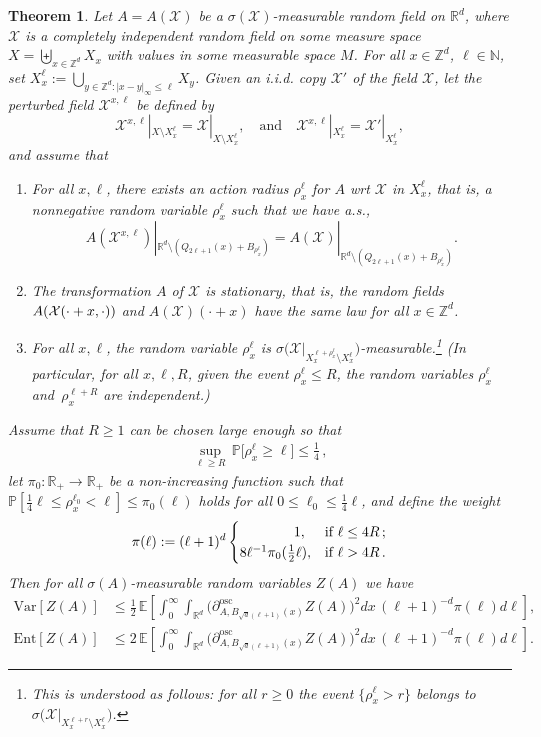 \documentclass[11pt]{article}
\newtheorem{theo}{Theorem}[section]
\theoremstyle{definition}
\numberwithin{equation}{section}
\numberwithin{figure}{section}
\numberwithin{table}{section}
\newcommand{\N}{\mathbb N}
\newcommand{\R}{\mathbb R}
\newcommand{\Z}{\mathbb Z}
\newcommand{\expec}[1]{\mathbb{E}\left[#1 \right]}
\newcommand{\pr}[1]{\mathbb{P}\left[#1 \right]}
\newcommand{\prm}[1]{\mathbb{P}\big[#1 \big]}
\newcommand{\X}{\mathcal X}
\newcommand{\osc}{\partial^{\mathrm{osc}}}
\newcommand{\oscd}[1]{\mathrel{\osc_{#1}}}
\newcommand{\var}[1]{\mathrm{Var}\left[#1\right]}
\newcommand{\ent}[1]{\mathrm{Ent}\!\left[#1\right]}
\newcommand*{\alphenumi}{\renewcommand*{\theenumi}{\alph{enumi}}}
\begin{document}
\begin{theo}\label{th:ar-rpm}
Let $A=A(\X)$ be a $\sigma(\X)$-measurable random field on $\R^d$, where $\X$ is a completely independent random field on some measure space\linebreak$X=\biguplus_{x\in\Z^d}X_{x}$ with values in some measurable space $M$. For all $x\in\Z^d$, $\ell\in\N$, set $X_x^\ell:=\bigcup_{y\in\Z^d:|x-y|_\infty\le\ell}X_y$. Given an i.i.d. copy $\X'$ of the field $\X$, let the perturbed field $\X^{x,\ell}$ be defined by
\[
\X^{x,\ell}|_{X\setminus X_x^\ell}=\X|_{X\setminus X_x^\ell},\quad\text{and}\quad\X^{x,\ell}|_{X_x^\ell}=\X'|_{X_x^\ell},
\]
and assume that
\begin{enumerate}\alphenumi
\item \label{theo-2.8.1}For all $x,\ell$, there exists an action radius $\rho_x^\ell$ for $A$ wrt $\X$ in $X_x^\ell$, that is, a nonnegative random variable $\rho_x^\ell$ such that we have a.s.,
\[
A(\X^{x,\ell})|_{\R^d\setminus (Q_{2\ell+1}(x)+B_{\rho_x^\ell})}=A(\X)|_{\R^d\setminus (Q_{2\ell+1}(x)+B_{\rho_x^\ell})}.
\]
\item \label{theo-2.8.2}The transformation $A$ of $\X$ is stationary, that is, the random fields $A(\X\linebreak(\cdot+x,\cdot))$ and $A(\X)(\cdot+x)$ have the same law for all $x\in\Z^d$.
\item \label{theo-2.8.3}For all $x,\ell$, the random variable $\rho_x^\ell$ is $\sigma\Big(\X\big|_{X_x^{\ell+\rho_x^\ell}\setminus X_x^\ell}\Big)$-measurable.\footnote{This is understood as follows: for all $r\ge0$ the event $\{\rho_x^\ell>r\}$ belongs to $\sigma\Big(\X\big|_{X_x^{\ell+r}\setminus X_x^\ell}\Big)$.}
(In particular, for all $x,\ell,R$, given the event $\rho_x^\ell\le R$, the random variables $\rho_x^\ell$ and~$\rho_x^{\ell+R}$ are independent.)
\end{enumerate}
Assume that $R\ge1$ can be chosen large enough so that
\begin{align}\label{eq:choice-R}
\sup_{\ell\ge R}\,\prm{\rho_x^\ell\ge\ell}\le\tfrac14\,,
\end{align}
let $\pi_0:\R_+\to\R_+$ be a non-increasing function such that $\pr{\frac14\ell\le\rho_x^{\ell_0}<\ell}\le\pi_0(\ell)$ holds for all $0\le\ell_0\le\frac14\ell$, and define the weight 
\[
\pi(\ell):=(\ell+1)^{d}
\begin{cases}
\mkern70mu1,&\text{if }\ell\le 4R\,;\\8\ell^{-1}\pi_0(\frac12\ell),&\text{if }\ell>4R\,.
\end{cases}
\]
Then for all $\sigma(A)$-measurable random variables $Z(A)$ we have
\begin{align}
\var{Z(A)}&\le\frac12\,\expec{\int_0^\infty\int_{\R^d}{\Big(\oscd{A,B_{\sqrt d(\ell+1)}(x)}Z(A)\Big)^2}dx\,(\ell+1)^{-d}\pi(\ell) d\ell},\label{eq:AG-SG}
\\
\ent{Z(A)}&\le2\,\expec{\int_0^\infty\int_{\R^d}{\Big(\oscd{A,B_{\sqrt d(\ell+1)}(x)}Z(A)\Big)^2}dx\,(\ell+1)^{-d}\pi(\ell) d\ell}.\label{eq:AG-LSI}
\end{align}

\end{theo}
\end{document}
